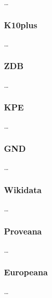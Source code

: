 \dots

\subsubsection{K10plus}

\dots

\subsubsection{ZDB}

\dots

\subsubsection{KPE}

\dots

\subsubsection{GND}

\dots

\subsubsection{Wikidata}

\dots

\subsubsection{Proveana}

\dots

\subsubsection{Europeana}

\dots

\par\bigskip
{}

